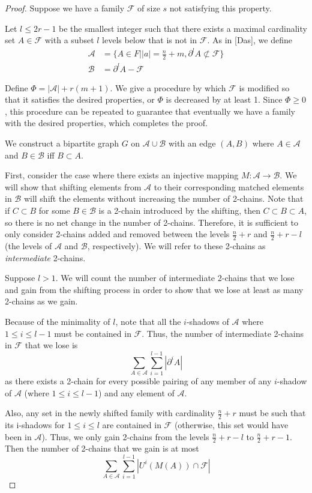 \documentclass[12pt]{article}
\theoremstyle{plain}
\theoremstyle{definition}
\theoremstyle{remark}
\newcommand{\F}{\mathcal{F}}
\newcommand{\A}{\mathcal{A}}
\newcommand{\B}{\mathcal{B}}
\begin{document}
\begin{proof} 
Suppose we have a family $\F$ of size $s$ not satisfying this property.

Let $l \leq 2r-1$ be the smallest integer such that there exists a maximal cardinality set $A \in \F$ with a subset $l$ levels below that is not in $\F$. As in [Das], we define
\begin{align*}
\A &= \{A \in F| \lvert a \rvert = \frac{n}{2}+m, \partial^l A \not\subset \F \}\\
\B &= \partial^l A - \F
\end{align*}

Define $\Phi = |\A| + r(m+1)$. We give a procedure by which $\F$ is modified so that it satisfies the desired properties, or $\Phi$ is decreased by at least 1. Since $\Phi \geq 0$, this procedure can be repeated to guarantee that eventually we have a family with the desired properties, which completes the proof.

We construct a bipartite graph $G$ on $\A \cup \B$ with an edge $(A,B)$ where $A \in \A$ and $B \in \B$ iff $B \subset A$.

First, consider the case where there exists an injective mapping $M: \A \to \B$. We will show that shifting elements from $\A$ to their corresponding matched elements in $\B$ will shift the elements without increasing the number of 2-chains. Note that if $C \subset B$ for some $B \in \B$ is a 2-chain introduced by the shifting, then $C \subset B \subset A$, so there is no net change in the number of 2-chains. Therefore, it is sufficient to only consider 2-chains added and removed between the levels $\frac{n}{2} + r$ and $\frac{n}{2} + r - l$ (the levels of $\A$ and $\B$, respectively). We will refer to these 2-chains as \emph{intermediate} 2-chains.

Suppose $l > 1$. We will count the number of intermediate 2-chains that we lose and gain from the shifting process in order to show that we lose at least as many 2-chains as we gain.

Because of the minimality of $l$, note that all the $i$-shadows of $\A$ where $1 \leq i \leq l - 1$ must be contained in $\F$. Thus, the number of intermediate 2-chains in $\F$ that we lose is
\[ \sum_{A \in \A}\sum_{i = 1}^{l-1} |\partial^i A | \]
as there exists a 2-chain for every possible pairing of any member of any $i$-shadow of $\A$ (where $1 \leq i \leq l-1$) and any element of $\A$. 

Also, any set in the newly shifted family with cardinality $\frac{n}{2} + r$ must be such that its i-shadows for $1 \leq i \leq l$ are contained in $\F$ (otherwise, this set would have been in $\A$). Thus, we only gain 2-chains from the levels $\frac{n}{2} + r - l$ to $\frac{n}{2} + r - 1$. Then the number of 2-chains that we gain is at most
\[\sum_{A\in \A}\sum_{i = 1}^{l-1} |U^i(M(A)) \cap \F| \]


\end{proof}
\end{document}
